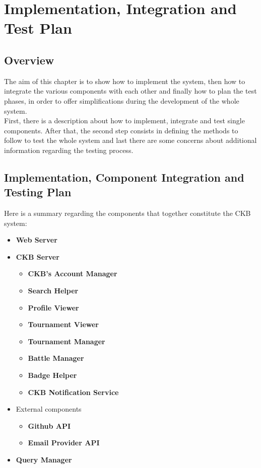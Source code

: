 \section{Implementation, Integration and Test Plan}

\subsection{Overview}

The aim of this chapter is to show how to implement the system, then how to integrate the various components with each other and finally how to plan the test phases, in order to offer simplifications during the development of the whole system.
\\First, there is a description about how to implement, integrate and test single components. After that, the second step consists in defining the methods to follow to test the whole system and last there are some concerns about additional information regarding the testing process.

\subsection{Implementation, Component Integration and Testing Plan}

Here is a summary regarding the components that together constitute the CKB system:

\vspace{0.5cm}

\begin{itemize}
    \item \textbf{Web Server}
    \item \textbf{CKB Server}
    \begin{itemize}
        \item \textbf{CKB's Account Manager}
        \item \textbf{Search Helper}
        \item \textbf{Profile Viewer}
        \item \textbf{Tournament Viewer}
        \item \textbf{Tournament Manager}
        \item \textbf{Battle Manager}
        \item \textbf{Badge Helper}
        \item \textbf{CKB Notification Service}
    \end{itemize}
    \item External components
    \begin{itemize}
        \item \textbf{Github API}
        \item \textbf{Email Provider API}
    \end{itemize}
    \item \textbf{Query Manager}
\end{itemize}

